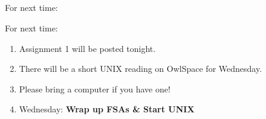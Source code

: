 \documentclass[9pt,xcolor=pdftex,dvipsnames,table]{beamer}
\begin{document}
\subsection{}
\begin{frame}{For next time:}
     \begin{block}{For next time:}
          \begin{enumerate}
     	  \item Assignment 1 will be posted tonight.\\
          \item There will be a short UNIX reading on OwlSpace for Wednesday.\\
          \item Please bring a computer if you have one!\\
          \item Wednesday: \textbf{Wrap up FSAs \& Start UNIX}
          \end{enumerate}
     \end{block}
\end{frame}
\end{document}
